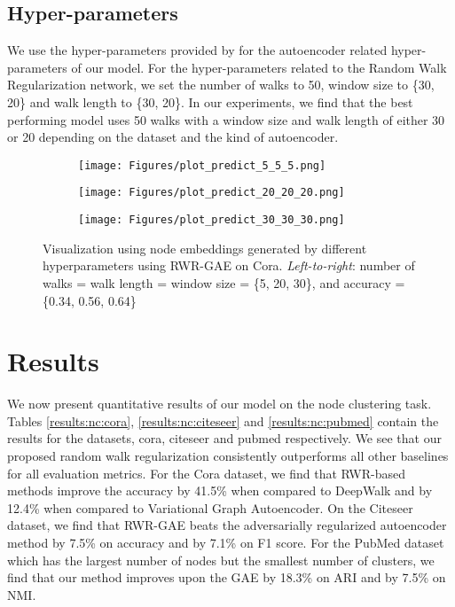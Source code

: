 \documentclass{article}
\begin{document}
\subsection{Hyper-parameters}
We use the hyper-parameters provided by \cite{vgae} for the autoencoder related hyper-parameters of our model. For the hyper-parameters related to the Random Walk Regularization network, we set the number of walks to 50, window size to \{30, 20\} and walk length to \{30, 20\}. In our experiments, we find that the best performing model uses 50 walks with a window size and walk length of either 30 or 20 depending on the dataset and the kind of autoencoder.

\begin{figure*}[t]
\centering
\begin{subfigure}{.35\textwidth}
  \texttt{[image: Figures/plot\_predict\_5\_5\_5.png]}
\end{subfigure}\begin{subfigure}{.35\textwidth}
  \texttt{[image: Figures/plot\_predict\_20\_20\_20.png]}
\end{subfigure}\begin{subfigure}{.35\textwidth}
  \texttt{[image: Figures/plot\_predict\_30\_30\_30.png]}
\end{subfigure}\caption{Visualization using node embeddings generated by different hyperparameters using RWR-GAE on Cora. \textit{Left-to-right}: number of walks = walk length = window size = \{5, 20, 30\}, and accuracy = \{0.34, 0.56, 0.64\}}
\label{fig:vis:params}
\vspace{-1\baselineskip}
\end{figure*}

\section{Results}
We now present quantitative results of our model on the node clustering task. Tables \ref{results:nc:cora}, \ref{results:nc:citeseer} and \ref{results:nc:pubmed} contain the results for the datasets, cora, citeseer and pubmed respectively. We see that our proposed random walk regularization consistently outperforms all other baselines for all evaluation metrics. For the Cora dataset, we find that RWR-based methods improve the accuracy by 41.5\% when compared to DeepWalk and by 12.4\% when compared to Variational Graph Autoencoder. On the Citeseer dataset, we find that RWR-GAE beats the adversarially regularized autoencoder method by 7.5\% on accuracy and by 7.1\% on F1 score. For the PubMed dataset which has the largest number of nodes but the smallest number of clusters, we find that our method improves upon the GAE by 18.3\% on ARI and by 7.5\% on NMI.
\end{document}
